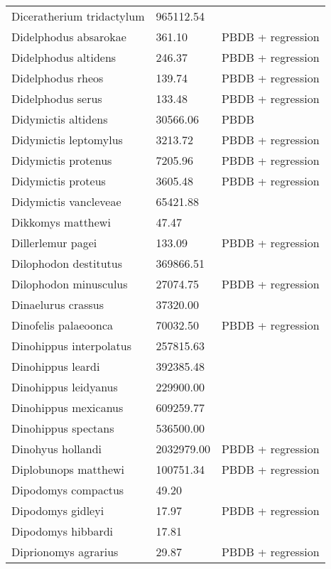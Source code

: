 \documentclass{article}
\begin{document}
\begin{center}
\begin{longtable}{p{} p{} p{}}
    Diceratherium tridactylum & 965112.54 & \cite{Tomiya2013} \\ 
    Didelphodus absarokae & 361.10 & PBDB + regression \\ 
    Didelphodus altidens & 246.37 & PBDB + regression \\ 
    Didelphodus rheos & 139.74 & PBDB + regression \\ 
    Didelphodus serus & 133.48 & PBDB + regression \\ 
    Didymictis altidens & 30566.06 & PBDB \\ 
    Didymictis leptomylus & 3213.72 & PBDB + regression \\ 
    Didymictis protenus & 7205.96 & PBDB + regression \\ 
    Didymictis proteus & 3605.48 & PBDB + regression \\ 
    Didymictis vancleveae & 65421.88 & \cite{Scott2004} \\ 
    Dikkomys matthewi & 47.47 & \cite{Tomiya2013} \\ 
    Dillerlemur pagei & 133.09 & PBDB + regression \\ 
    Dilophodon destitutus & 369866.51 & \cite{Sinclair1915} \\ 
    Dilophodon minusculus & 27074.75 & PBDB + regression \\ 
    Dinaelurus crassus & 37320.00 & \cite{McKenna2011} \\ 
    Dinofelis palaeoonca & 70032.50 & PBDB + regression \\ 
    Dinohippus interpolatus & 257815.63 & \cite{Tomiya2013} \\ 
    Dinohippus leardi & 392385.48 & \cite{Tomiya2013} \\ 
    Dinohippus leidyanus & 229900.00 & \cite{MacFadden1986} \\ 
    Dinohippus mexicanus & 609259.77 & \cite{Tomiya2013} \\ 
    Dinohippus spectans & 536500.00 & \cite{McKenna2011} \\ 
    Dinohyus hollandi & 2032979.00 & PBDB + regression \\ 
    Diplobunops matthewi & 100751.34 & PBDB + regression \\ 
    Dipodomys compactus & 49.20 & \cite{Smith2004} \\ 
    Dipodomys gidleyi & 17.97 & PBDB + regression \\ 
    Dipodomys hibbardi & 17.81 & \cite{Tomiya2013} \\ 
    Diprionomys agrarius & 29.87 & PBDB + regression \\ 

\end{longtable}
\end{center}
\end{document}
